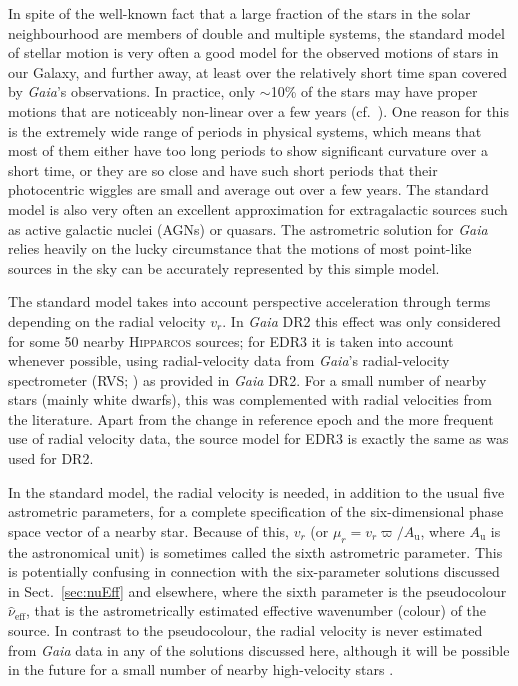\documentclass[longauth]{aa} %
\begin{document}
In spite of the well-known fact that a large fraction of the stars in the solar neighbourhood are members
of double and multiple systems, the standard model of stellar motion is very often a good 
model for the observed motions of stars in our Galaxy, and further away, at least over the
relatively short time span covered  by \textit{Gaia}'s observations. In practice, only 
$\sim$10\% of the stars may have proper motions that are noticeably non-linear over 
a few years (cf.\ ). One reason for this is the extremely
wide range of periods in physical systems, which means that most of them either have
too long periods to show significant curvature over a short time, or they are so close and 
have such short periods that their photocentric wiggles are small and average out over a 
few years. The standard model is also very often an excellent approximation for extragalactic
sources such as active galactic nuclei (AGNs) or quasars. The astrometric solution for 
\textit{Gaia} relies heavily on the lucky circumstance that the motions of most point-like 
sources in the sky can be accurately represented by this simple model. 

The standard model takes into account perspective acceleration through terms depending 
on the radial velocity $v_r$. In \textit{Gaia} DR2 this effect was only considered for some 
50 nearby \textsc{Hipparcos} sources; for EDR3 it is taken into account whenever possible, 
using radial-velocity data from \textit{Gaia}'s radial-velocity spectrometer 
(RVS; \citealt{2018A&A...616A...6S}) as provided in \textit{Gaia} DR2. For a small number of nearby 
stars (mainly white dwarfs), this was complemented with radial velocities from the literature.
Apart from the change in reference epoch and the more frequent use of radial velocity
data, the source model for EDR3 is exactly the same as was used for DR2.

In the standard model, the radial velocity is needed, in addition to the usual five astrometric parameters,
for a complete specification of the six-dimensional phase space vector of a nearby star. 
Because of this, $v_r$ (or $\mu_r= v_r\varpi/A_\text{u}$, where $A_\text{u}$ is the astronomical
unit) is sometimes called the sixth astrometric parameter. This is potentially confusing
in connection with the six-parameter solutions discussed in Sect.~\ref{sec:nuEff} and
elsewhere, where the sixth parameter is the pseudocolour $\hat{\nu}_\text{eff}$, that is 
the astrometrically estimated effective wavenumber (colour) of the source. In contrast
to the pseudocolour, the radial velocity is never estimated from \textit{Gaia} data
in any of the solutions discussed here, although it will be possible in the future for a small 
number of nearby high-velocity stars .
\end{document}
